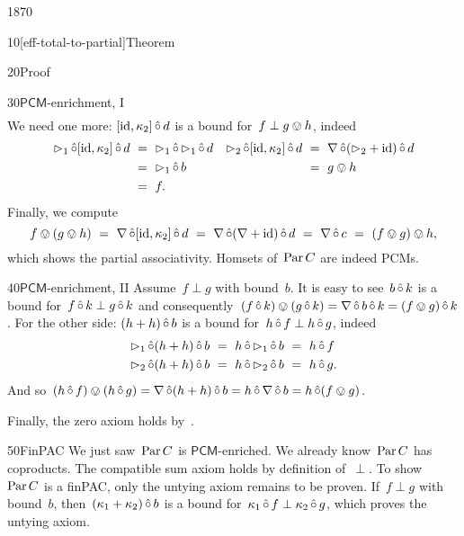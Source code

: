 \begin{parsec}{1870}
\begin{point}{10}[eff-total-to-partial]{Theorem}
\begin{point}{20}{Proof}
\begin{point}{30}{$\mathsf{PCM}$-enrichment, I}
\begin{align*}
\end{align*}
We need one more:
    $[\operatorname{id},\kappa_2]\mathop{\hat\circ} d$ is a bound for~$f \perp g \ovee h$, indeed
\begin{align*}
    \mathord{\vartriangleright}_1 \mathop{\hat\circ} [\operatorname{id},\kappa_2] \mathop{\hat\circ} d
        & \ = \ \mathord{\vartriangleright}_1 \mathop{\hat\circ} \mathord{\vartriangleright}_1 \mathop{\hat\circ} d
    & \mathord{\vartriangleright}_2 \mathop{\hat\circ} [\operatorname{id},\kappa_2]\mathop{\hat\circ} d & \ =\ \nabla \mathop{\hat\circ} (\mathord{\vartriangleright}_2 + \operatorname{id}) \mathop{\hat\circ} d \\
        & \ = \ \mathord{\vartriangleright}_1 \mathop{\hat\circ} b
        && \ =\  g \ovee h \\
        & \ = \ f.
\end{align*}
Finally,
we compute
\begin{equation*}
f \ovee (g \ovee h)
\ = \ \nabla \mathop{\hat\circ} [\operatorname{id}, \kappa_2] \mathop{\hat\circ} d
\ = \ \nabla \mathop{\hat\circ} (\nabla+ \operatorname{id}) \mathop{\hat\circ} d
\ = \ \nabla \mathop{\hat\circ} c
\ = \ (f \ovee g) \ovee h,
\end{equation*}
which shows the partial associativity.
Homsets of~$\operatorname{Par} C$ are indeed PCMs.
\end{point}
\begin{point}{40}{$\mathsf{PCM}$-enrichment, II}%
Assume~$f \perp g$ with bound~$b$.
It is easy to see~$b \mathop{\hat\circ} k$
    is a bound for~$f \mathop{\hat\circ} k \perp g \mathop{\hat\circ} k$
    and consequently~$(f \mathop{\hat\circ} k) \ovee (g \mathop{\hat\circ} k)
                = \nabla \mathop{\hat\circ} b \mathop{\hat\circ} k = 
                (f \ovee g) \mathop{\hat\circ} k$.
For the other side:
$(h + h) \mathop{\hat\circ} b$ is a bound for~$h \mathop{\hat\circ} f \perp h \mathop{\hat\circ} g$,
    indeed
\begin{align*}
    \pproj_1 \hafter (h+h) \hafter b
    &\ = \ 
    h\hafter \pproj_1 \hafter b \ =\  h \hafter f \\
    \pproj_2 \hafter (h+h) \hafter b
    &\ = \ 
    h\hafter \pproj_2 \hafter b\  =\  h \hafter g.
\end{align*}
And so~$(h \mathop{\hat\circ} f) \ovee (h \mathop{\hat\circ} g)
            = \nabla \mathop{\hat\circ} (h+h) \mathop{\hat\circ} b
            = h \mathop{\hat\circ} \nabla \mathop{\hat\circ} b = h \mathop{\hat\circ} (f \ovee g)$.
\end{point}
Finally, the zero axiom holds by~\sref{toteff-zero}.
\begin{point}{50}{FinPAC}%
We just saw~$\operatorname{Par} C$ is $\mathsf{PCM}$-enriched.
We already know~$\operatorname{Par} C$ has coproducts.
The compatible sum axiom holds by definition of~$\perp$.
To show~$\operatorname{Par} C$ is a finPAC,
    only the untying axiom remains to be proven.
If~$f \perp g$ with bound~$b$,
then~$(\kappa_1 + \kappa_2) \mathop{\hat\circ} b$ is a bound for~$\kappa_1 \mathop{\hat\circ} f
    \perp \kappa_2 \mathop{\hat\circ} g$,
    which proves the untying axiom.
\end{point}

\end{point}
\end{point}
\end{parsec}
